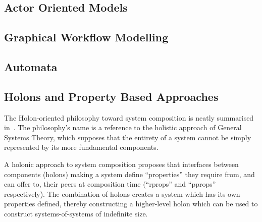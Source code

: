 \documentclass[draft,12pt]{article}
\begin{document}
\subsection{Actor Oriented Models}



\subsection{Graphical Workflow Modelling}



\subsection{Automata}


\subsection{Holons and Property Based Approaches}
The Holon-oriented philosophy toward system composition is neatly summarised
in~\cite{blair2015holons}. The philosophy's name is a reference to the holistic
approach of General Systems Theory, which supposes that the entirety of a system
cannot be simply represented by its more fundamental components.
\par

A holonic approach to system composition proposes that interfaces between
components (holons) making a system define ``properties'' they require from, and
can offer to, their peers at composition time (``rprops'' and ``pprops''
respectively). The combination of holons creates a system which has its own
properties defined, thereby constructing a higher-level holon which can be used
to construct systems-of-systems of indefinite size.
\par
\end{document}
